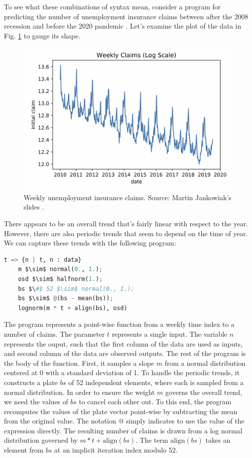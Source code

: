 \documentclass[letterpaper]{llncs}
\begin{document}
To see what these combinations of syntax mean, consider a program
for predicting the number of unemployment insurance claims 
between after the 2008 recession and before the 2020 pandemic \cite{plot}.
Let's examine the plot of the data in Fig. \ref{fig:plot} to gauge its shape.
\begin{figure}[h]
\begin{center}
\includegraphics[scale=0.35]{weekly_claims}
\end{center}

\caption{
Weekly unemployment insurance claims. Source: Martin Jankowiak's slides \cite{plot}.   
}
\label{fig:plot}
\end{figure}
There appears to be an overall trend that's fairly linear with respect to the year. 
However, there are also periodic trends that seem to depend on the time of year.  
We can capture these trends with the following program:

\begin{lstlisting}[language=Python]
t => {n | t, n : data}
    m $\sim$ normal(0., 1.); 
    osd $\sim$ halfnorm(1.); 
    bs $\#$ 52 $\sim$ normal(0., 1.); 
    bs $\sim$ @(bs - mean(bs));
    lognorm(m * t + align(bs), osd)
\end{lstlisting}

The program represents a point-wise function from a weekly time index to a number of claims.
The parameter $t$ represents a single input. The variable $n$ represents
the ouput, such that the first column of the data are used as inputs, 
and second column of the data are observed outputs.
The rest of the program is the body of the function.
First, it samples a slope $m$ from a normal distribution centered at 0 with 
a standard deviation of 1. To handle the periodic trends, it constructs
a plate $bs$ of 52 independent elements, where each is sampled from 
a normal distribution. In order to ensure the weight $m$ governs
the overall trend, we need the values of $bs$ to cancel each other out.
To this end, the program recomputes the values of the plate vector point-wise 
by subtracting the mean from the original value. The notation $@$ simply indicates
to use the value of the expression directly.
The resulting number of claims is drawn from a log normal distribution
governed by $m * t + \text{align}(bs)$. The term $\text{align}(bs)$ takes an element from $bs$ 
at an implicit iteration index modulo 52. 
\end{document}
